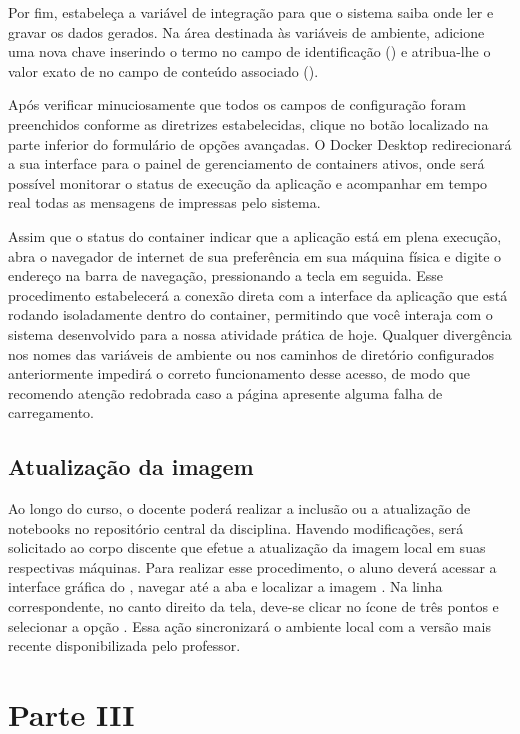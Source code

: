 Por fim, estabeleça a variável de integração para que o sistema saiba onde ler e gravar os dados gerados. Na área destinada às variáveis de ambiente, adicione uma nova chave inserindo o termo  no campo de identificação () e atribua-lhe o valor exato de  no campo de conteúdo associado ().

Após verificar minuciosamente que todos os campos de configuração foram preenchidos conforme as diretrizes estabelecidas, clique no botão  localizado na parte inferior do formulário de opções avançadas. O Docker Desktop redirecionará a sua interface para o painel de gerenciamento de containers ativos, onde será possível monitorar o status de execução da aplicação e acompanhar em tempo real todas as mensagens de  impressas pelo sistema.

Assim que o status do container indicar que a aplicação está em plena execução, abra o navegador de internet de sua preferência em sua máquina física e digite o endereço  na barra de navegação, pressionando a tecla  em seguida. Esse procedimento estabelecerá a conexão direta com a interface da aplicação que está rodando isoladamente dentro do container, permitindo que você interaja com o sistema desenvolvido para a nossa atividade prática de hoje.
Qualquer divergência nos nomes das variáveis de ambiente ou nos caminhos de diretório configurados anteriormente impedirá o correto funcionamento desse acesso, de modo que recomendo atenção redobrada caso a página apresente alguma falha de carregamento.

\subsection*{Atualização da imagem}

Ao longo do curso, o docente poderá realizar a inclusão ou a atualização de notebooks no repositório central da disciplina. Havendo modificações, será solicitado ao corpo discente que efetue a atualização da imagem local em suas respectivas máquinas. Para realizar esse procedimento, o aluno deverá acessar a interface gráfica do , navegar até a aba  e localizar a imagem . Na linha correspondente, no canto direito da tela, deve-se clicar no ícone de três pontos e selecionar a opção . Essa ação sincronizará o ambiente local com a versão mais recente disponibilizada pelo professor.


\section*{Parte III}

